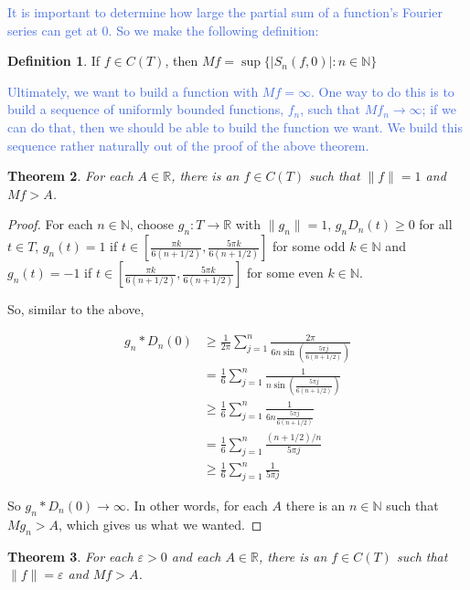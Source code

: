 \documentclass{amsart}
\newcommand{\vep}{\varepsilon}
\newcommand{\N}{\mathbb{N}}
\newcommand{\R}{\mathbb{R}}
\newcommand{\colorcomment}[2]{\textcolor{#1}{#2}} %
\newcommand{\absval}[1]{\left| #1 \right|}
\newcommand{\norm}[1]{\|#1\|}
\newtheorem{thm}{Theorem}[section]
\theoremstyle{definition}
\newtheorem{definition}[thm]{Definition}
\begin{document}
\colorcomment{RoyalBlue}{It is important to determine how large the partial sum of a function's Fourier series can get at $0$. 
So we make the following definition:}

\begin{definition}
If $f \in C(T)$, then $Mf = \sup\{\absval{S_n(f,0)} : n \in \N\}$ 
\end{definition}

\colorcomment{RoyalBlue}{Ultimately, we want to build a function with $Mf = \infty$.
One way to do this is to build a sequence of uniformly bounded functions, $f_n$, such that $Mf_n \to \infty$; 
if we can do that, then we should be able to build the function we want.
We build this sequence rather naturally out of the proof of the above theorem.}

\begin{thm}
For each $A \in \R$, there is an $f \in C(T)$ such that $\norm{f} = 1$ and $Mf > A$. 
\end{thm}

\begin{proof}
For each $n \in \N$, choose $g_n: T \to \R$ with $\norm{g_n} = 1$, $g_nD_n(t) \geq 0$ for all $t \in T$,  $g_n(t) = 1$ if $t \in [\frac{\pi k}{6(n+1/2)},\frac{5 \pi k}{6(n+1/2)}]$ for some odd $k \in \N$  and $g_n(t) = -1$ if $t \in [\frac{\pi k}{6(n+1/2)},\frac{5 \pi k}{6(n+1/2)}]$ for some even $k \in \N$.


So, similar to the above,

\begin{align*}
g_n \ast D_n(0) &\geq \frac{1}{2 \pi} \sum\limits_{j=1}^n \frac{2 \pi}{6n \sin(\frac{5\pi j}{6(n+1/2)})}\\
&= \frac{1}{6} \sum\limits_{j=1}^n \frac{1}{n \sin(\frac{5\pi j}{6(n+1/2)})}\\
&\geq \frac{1}{6} \sum\limits_{j=1}^n \frac{1}{6n \frac{5\pi j}{6(n+1/2)}}\\
&= \frac{1}{6} \sum\limits_{j=1}^n \frac{(n+1/2)/{n}}{5\pi j}\\
&\geq \frac{1}{6} \sum\limits_{j=1}^n \frac{1}{5\pi j}
\end{align*}

So $g_n \ast D_n(0) \to \infty$. In other words, for each $A$ there is an $n \in \N$ such that $Mg_n > A$, which gives us what we wanted.

\end{proof}

\begin{thm}
For each $\vep >0$ and each $A \in \R$, there is an $f \in C(T)$ such that $\norm{f} = \vep $ and $Mf > A$. 

\end{thm}
\end{document}
